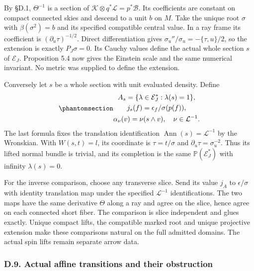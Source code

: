 \documentclass[
  english,
  11pt,
  reqno]{amsart}
\begin{document}
By §D.1, \(\Theta^{-1}\) is a section of
\(\mathcal K\otimes q^*\mathcal L=p^*\mathcal B\). Its coefficients are
constant on compact connected skies and descend to a unit \(b\) on
\(M\). Take the unique root \(\sigma\) with \(\beta(\sigma^2)=b\) and
its specified compatible central value. In a ray frame its coefficient
is \((\partial_u\tau)^{-1/2}\). Direct differentiation gives
\(\sigma_u''/\sigma_u=-\{\tau,u\}/2\), so the extension is exactly
\(P_J\sigma=0\). Its Cauchy values define the actual whole section \(s\)
of \(\mathcal E_J\). Proposition 5.4 now gives the Einstein scale and
the same numerical invariant. No metric was supplied to define the
extension.

Conversely let \(s\) be a whole section with unit evaluated density.
Define
\begin{equation}\protect\phantomsection\label{eq:gg-affine-from-section}{\begin{gathered}
A_s=\{\lambda\in\mathcal E_J^*:\lambda(s)=1\}, \\
j_s(f)=\epsilon_f/\sigma(p(f)), \\
\alpha_\nu(v)=\nu(s\wedge v),\quad \nu\in\mathcal L^{-1}.
\end{gathered}}\end{equation} The last formula fixes the translation identification
\(\operatorname{Ann}(s)=\mathcal L^{-1}\) by the Wronskian. With
\(W(s,t)=l\), its coordinate is \(\tau=t/\sigma\) and
\(\partial_u\tau=\sigma_u^{-2}\). Thus its lifted normal bundle is
trivial, and its completion is the same \(\mathbb P(\mathcal E_J^*)\)
with infinity \(\lambda(s)=0\).

For the inverse comparison, choose any transverse slice. Send its value
\(j_A\) to \(\epsilon/\sigma\) with identity translation map under the
specified \(\mathcal L^{-1}\) identifications. The two maps have the
same derivative \(\Theta\) along a ray and agree on the slice, hence
agree on each connected short fiber. The comparison is slice independent
and glues exactly. Unique compact lifts, the compatible marked root and
unique projective extension make these comparisons natural on the full
admitted domains. The actual spin lifts remain separate arrow data.

\protect{}\label{sec:gg-actual-affine-cocycles}

\subsubsection{D.9. Actual affine transitions and their
obstruction}\label{d.9.-actual-affine-transitions-and-their-obstruction}
\end{document}
